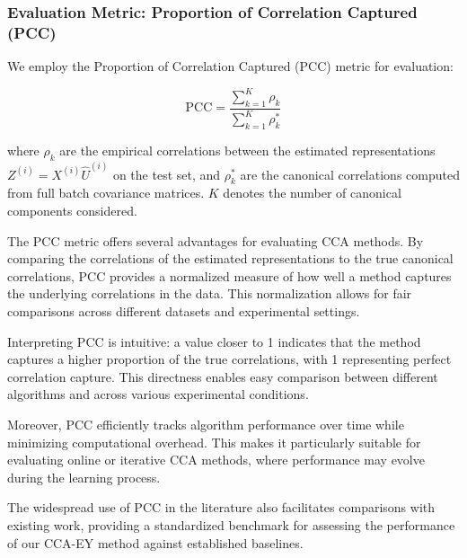 \subsubsection{Evaluation Metric: Proportion of Correlation Captured (PCC)}
We employ the Proportion of Correlation Captured (PCC) metric for evaluation:

\[
    \text{PCC} = \frac{\sum_{k=1}^K \rho_k}{\sum_{k=1}^K \rho_k^*}
\]

where $\rho_k$ are the empirical correlations between the estimated representations $Z^{(i)} = X^{(i)}\hat{U}^{(i)}$ on the test set, and $\rho_k^*$ are the canonical correlations computed from full batch covariance matrices. $K$ denotes the number of canonical components considered.

The PCC metric offers several advantages for evaluating CCA methods. By comparing the correlations of the estimated representations to the true canonical correlations, PCC provides a normalized measure of how well a method captures the underlying correlations in the data. This normalization allows for fair comparisons across different datasets and experimental settings.

Interpreting PCC is intuitive: a value closer to 1 indicates that the method captures a higher proportion of the true correlations, with 1 representing perfect correlation capture. This directness enables easy comparison between different algorithms and across various experimental conditions.

Moreover, PCC efficiently tracks algorithm performance over time while minimizing computational overhead. This makes it particularly suitable for evaluating online or iterative CCA methods, where performance may evolve during the learning process.

The widespread use of PCC in the literature \citep{meng2021online, gemp2022generalized, ma2015finding, ge2016efficient} also facilitates comparisons with existing work, providing a standardized benchmark for assessing the performance of our CCA-EY method against established baselines.


